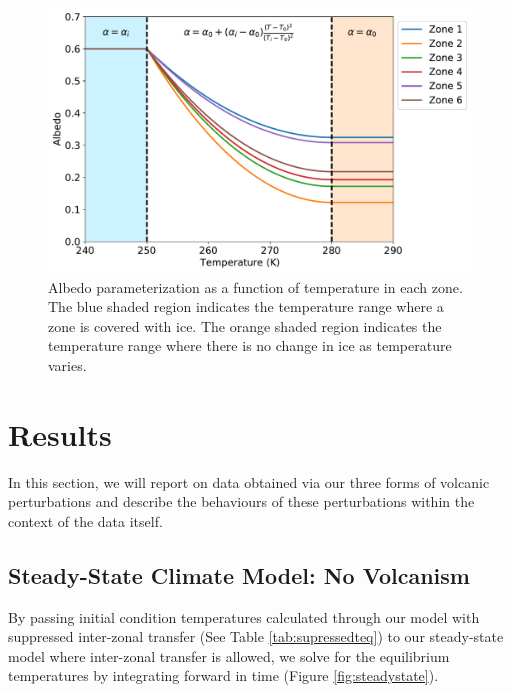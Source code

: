 \documentclass[12pt]{article}
\begin{document}
\begin{figure}[H]
    \centering
    \includegraphics[scale=0.6]{albedo.pdf}
    \caption{
        Albedo parameterization as a function of temperature in each zone.
        The blue shaded region indicates the temperature range where a zone
        is covered with ice. The orange shaded region indicates the temperature
        range where there is no change in ice as temperature varies.
    }
    \label{fig:albedotemp}
\end{figure}
\FloatBarrier

\section{Results}
\label{section:results}
In this section, we will report on data obtained via our three forms of volcanic
perturbations and describe the behaviours of these perturbations within the
context of the data itself.

\subsection{Steady-State Climate Model: No Volcanism}
By passing initial condition temperatures calculated through our model with
suppressed inter-zonal transfer (See Table \ref{tab:supressedteq}) to our
steady-state model where inter-zonal transfer is allowed, we solve for the
equilibrium temperatures by integrating forward in time
(Figure \ref{fig:steadystate}).
\end{document}
